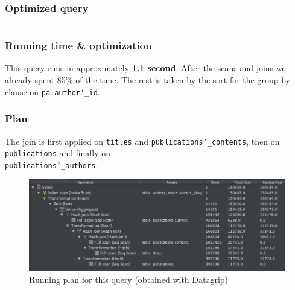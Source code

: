 \documentclass[doubleside, titlepage]{article}
\begin{document}
\subsubsection{Optimized query}
		\begin{lstlisting}[language=SQL,showspaces=false,basicstyle=\ttfamily,numberstyle=\tiny,commentstyle=\color{gray}]

		\end{lstlisting}
		
\subsubsection{Running time \& optimization}

This query runs in approximately \textbf{1.1 second}. After the scans and joins we already spent 85\% of the time. The rest is taken by the sort for the group by clause on \texttt{pa.author\char`_id}. 


\subsubsection{Plan}
The join is first applied on \texttt{titles} and \texttt{publications\char`_contents}, then on \texttt{publications} and finally on ~\\ \texttt{publications\char`_authors}.

\begin{figure}[!htb]
	\centering
    \includegraphics[scale = 0.5]{./query_analysis/query21}
    \caption{Running plan for this query (obtained with Datagrip)}
\end{figure}
\end{document}
